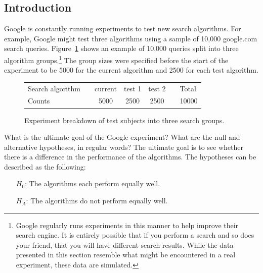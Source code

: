 \subsection{Introduction}
Google is constantly running experiments to test new search algorithms. For example, Google might test three algorithms using a sample of 10,000 google.com search queries. Figure~\ref{googleSearchAlgorithmByAlgorithmOnly} shows an example of 10,000 queries split into three algorithm groups.\footnote{Google regularly runs experiments in this manner to help improve their search engine. It is entirely possible that if you perform a search and so does your friend, that you will have different search results. While the data presented in this section resemble what might be encountered in a real experiment, these data are simulated.} The group sizes were specified before the start of the experiment to be 5000 for the current algorithm and 2500 for each test algorithm.

\begin{figure}[h]
\centering
\begin{tabular}{ll ccc ll}
\hline
Search algorithm	 & \hspace{1mm} & current & test 1 & test 2 & \hspace{1mm} & Total \\
Counts &		& 5000 & 2500 & 2500 & & 10000 \\
\hline
\end{tabular}
\caption{Experiment breakdown of test subjects into three search groups.}
\label{googleSearchAlgorithmByAlgorithmOnly}
\end{figure}


\begin{examplewrap}
\begin{nexample}{What is the ultimate goal of the Google experiment? What are the null and alternative hypotheses, in regular words?}
The ultimate goal is to see whether there is a difference in the performance of the algorithms. The hypotheses can be described as the following:\D{\vspace{-2mm}}
\begin{itemize}
\setlength{\itemsep}{0mm}
\item[$H_0$:] The algorithms each perform equally well.
\item[$H_A$:] The algorithms do not perform equally well.
\end{itemize}
\end{nexample}
\end{examplewrap}

